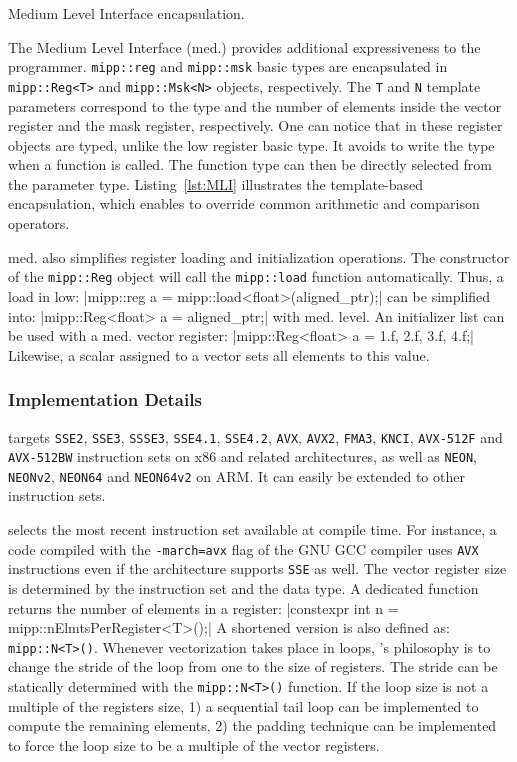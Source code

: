 \begin{listing}
  \inputminted[frame=lines,linenos]{C++}{main/chapter2/src/vectorization/mipp_mli.cpp}
  \caption{Medium Level Interface encapsulation.}
  \label{lst:MLI}
\end{listing}

The \MIPP Medium Level Interface (\MIPP med.) provides additional expressiveness
to the programmer. \verb|mipp::reg| and \verb|mipp::msk| basic types are
encapsulated in \verb|mipp::Reg<T>| and \verb|mipp::Msk<N>| objects,
respectively. The \verb|T| and \verb|N| template parameters correspond to the
type and the number of elements inside the vector register and the mask
register, respectively. One can notice that in these register objects are typed,
unlike the \MIPP low register basic type. It avoids to write the type when a
\MIPP function is called. The function type can then be directly selected from
the parameter type. Listing~\ref{lst:MLI} illustrates the template-based
encapsulation, which enables \MIPP to override common arithmetic and comparison
operators.

\MIPP med. also simplifies register loading and initialization operations. The
constructor of the \verb|mipp::Reg| object will call the \verb|mipp::load|
function automatically. Thus, a load in \MIPP low:
|mipp::reg a = mipp::load<float>(aligned_ptr);|
can be simplified into:
|mipp::Reg<float> a = aligned_ptr;|
with \MIPP med. level. An initializer list
can be used with a \MIPP med. vector register:
|mipp::Reg<float> a = {1.f, 2.f, 3.f, 4.f};|
Likewise, a scalar assigned to a vector sets all elements to
this value.

\subsubsection{Implementation Details}
\label{subsec:implem}

\MIPP targets \verb|SSE2|, \verb|SSE3|, \verb|SSSE3|, \verb|SSE4.1|,
\verb|SSE4.2|, \verb|AVX|, \verb|AVX2|, \verb|FMA3|, \verb|KNCI|,
\verb|AVX-512F| and \verb|AVX-512BW| instruction sets on x86 and related
architectures, as well as \verb|NEON|, \verb|NEONv2|, \verb|NEON64| and
\verb|NEON64v2| on ARM. It can easily be extended to other instruction sets.

\MIPP selects the most recent instruction set available at compile time. For
instance, a code compiled with the \verb|-march=avx| flag of the GNU GCC
compiler uses \verb|AVX| instructions even if the architecture supports
\verb|SSE| as well. The vector register size is determined by the instruction
set and the data type. A dedicated function returns the number of elements in a
\MIPP register:
|constexpr int n = mipp::nElmtsPerRegister<T>();|
A shortened version is also defined as: \verb|mipp::N<T>()|. Whenever
vectorization takes place in loops, \MIPP's philosophy is to change the stride
of the loop from one to the size of registers. The stride can be statically
determined with the \verb|mipp::N<T>()| function.
If the loop size is not a multiple of the registers size, 1) a sequential tail
loop can be implemented to compute the remaining elements, 2) the padding
technique can be implemented to force the loop size to be a multiple of the
vector registers.

